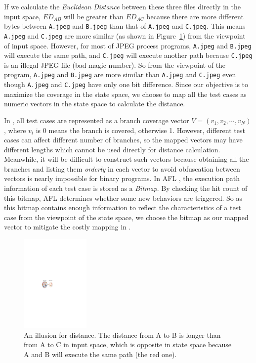 \indent If we calculate the \textit{Euclidean Distance} between these 
three files directly in the input space, $ED_{AB}$ will be greater 
than $ED_{AC}$ because there are more different bytes between 
\texttt{A.jpeg} and \texttt{B.jpeg} than that of \texttt{A.jpeg} 
and \texttt{C.jpeg}. This means \texttt{A.jpeg} and \texttt{C.jpeg} 
are more similar (as shown in Figure~\ref{distance-illusion}) from 
the viewpoint of input space. 
However, for most of JPEG process programs, \texttt{A.jpeg} and 
\texttt{B.jpeg} will execute the same path, and \texttt{C.jpeg} 
will execute another path because \texttt{C.jpeg} is an illegal 
JPEG file (bad magic number). So from the viewpoint of the program, 
\texttt{A.jpeg} and \texttt{B.jpeg} are more similar than 
\texttt{A.jpeg} and \texttt{C.jpeg} even though \texttt{A.jpeg} 
and \texttt{C.jpeg} have only one bit difference. 
Since our objective is to maximize the coverage in the state space, 
we choose to map all the test cases as numeric vectors in the state 
space to calculate the distance.

In \cite{wang2015similarity}, all test cases are represented as a branch 
coverage vector $\mathit{V}=(v_1, v_2, \cdots, v_N)$, where $v_i$ is 
0 means the branch is covered, otherwise 1. 
However, different test cases can affect different number of branches, 
so the mapped vectors may have different lengths which cannot be used 
directly for distance calculation. Meanwhile, it will be difficult to 
construct such vectors because obtaining all the branches and listing 
them \textit{orderly} in each vector to avoid obfuscation between 
vectors is nearly impossible for binary programs. 
In AFL \cite{online:afl}, the execution path information of each test 
case is stored as a \emph{Bitmap}. By checking the hit count of this 
bitmap, AFL determines whether some new behaviors are triggered. 
So as this bitmap contains enough information to reflect the 
characteristics of a test case from the viewpoint of the state space, 
we choose the bitmap as our mapped vector to mitigate the costly 
mapping in \cite{wang2015similarity}.

\begin{figure}
\centering
\includegraphics[width=0.3\textwidth]{figures/distance-illusion.pdf} 
\caption{An illusion for distance. The distance from A to B is longer 
	than from A to C in input space, which is opposite in state space 
	because A and B will execute the same path (the red one).}
\label{distance-illusion}
\end{figure}

